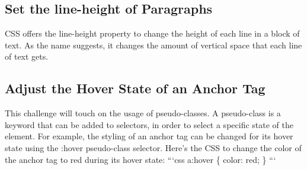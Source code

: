 \documentclass{article}%
\begin{document}
%
\subsection{Set the line{-}height of Paragraphs}%
\label{subsec:Settheline{-}heightofParagraphs}%
CSS offers the line{-}height property to change the height of each line in a block of text. As the name suggests, it changes the amount of vertical space that each line of text gets.\newline%

%
\subsection{Adjust the Hover State of an Anchor Tag}%
\label{subsec:AdjusttheHoverStateofanAnchorTag}%
This challenge will touch on the usage of pseudo{-}classes. A pseudo{-}class is a keyword that can be added to selectors, in order to select a specific state of the element.\newline%
For example, the styling of an anchor tag can be changed for its hover state using the :hover pseudo{-}class selector. Here's the CSS to change the color of the anchor tag to red during its hover state:\newline%
```css\newline%
a:hover \{\newline%
  color: red;\newline%
\}\newline%
```\newline%

%
\end{document}

